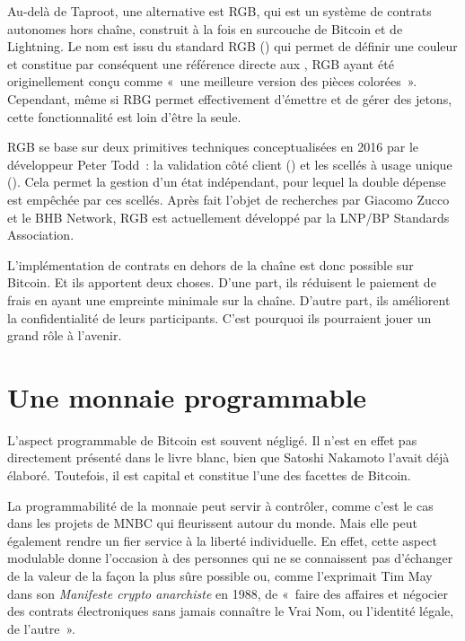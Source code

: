 Au-delà de Taproot, une alternative est RGB, qui est un système de contrats autonomes hors chaîne, construit à la fois en surcouche de Bitcoin et de Lightning. Le nom est issu du standard RGB () qui permet de définir une couleur et constitue par conséquent une référence directe aux , RGB ayant été originellement conçu comme «~une meilleure version des pièces colorées~». Cependant, même si RBG permet effectivement d'émettre et de gérer des jetons, cette fonctionnalité est loin d'être la seule.

RGB se base sur deux primitives techniques conceptualisées en 2016 par le développeur Peter Todd~: la validation côté client () et les scellés à usage unique (). Cela permet la gestion d'un état indépendant, pour lequel la double dépense est empêchée par ces scellés. Après fait l'objet de recherches par Giacomo Zucco et le BHB Network, RGB est actuellement développé par la LNP/BP Standards Association.

L'implémentation de contrats en dehors de la chaîne est donc possible sur Bitcoin. Et ils apportent deux choses. D'une part, ils réduisent le paiement de frais en ayant une empreinte minimale sur la chaîne. D'autre part, ils améliorent la confidentialité de leurs participants. C'est pourquoi ils pourraient jouer un grand rôle à l'avenir.

\section*{Une monnaie programmable}

L'aspect programmable de Bitcoin est souvent négligé. Il n'est en effet pas directement présenté dans le livre blanc, bien que Satoshi Nakamoto l'avait déjà élaboré. Toutefois, il est capital et constitue l'une des facettes de Bitcoin.

La programmabilité de la monnaie peut servir à contrôler, comme c'est le cas dans les projets de MNBC qui fleurissent autour du monde. Mais elle peut également rendre un fier service à la liberté individuelle. En effet, cette aspect modulable donne l'occasion à des personnes qui ne se connaissent pas d'échanger de la valeur de la façon la plus sûre possible ou, comme l'exprimait Tim May dans son \emph{Manifeste crypto anarchiste} en 1988, de «~faire des affaires et négocier des contrats électroniques sans jamais connaître le Vrai Nom, ou l'identité légale, de l'autre~».

